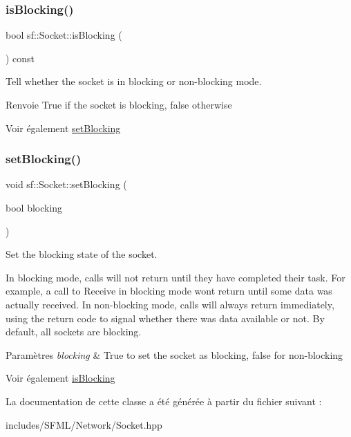 \subsubsection{\texorpdfstring{is\+Blocking()}{isBlocking()}}
{\footnotesize\ttfamily bool sf\+::\+Socket\+::is\+Blocking (\begin{DoxyParamCaption}{ }\end{DoxyParamCaption}) const}



Tell whether the socket is in blocking or non-\/blocking mode. 

\begin{DoxyReturn}{Renvoie}
True if the socket is blocking, false otherwise
\end{DoxyReturn}
\begin{DoxySeeAlso}{Voir également}
\hyperlink{classsf_1_1Socket_a165fc1423e281ea2714c70303d3a9782}{set\+Blocking} 
\end{DoxySeeAlso}
\mbox{\label{classsf_1_1Socket_a165fc1423e281ea2714c70303d3a9782}} 
\subsubsection{\texorpdfstring{set\+Blocking()}{setBlocking()}}
{\footnotesize\ttfamily void sf\+::\+Socket\+::set\+Blocking (\begin{DoxyParamCaption}\item[{bool}]{blocking }\end{DoxyParamCaption})}



Set the blocking state of the socket. 

In blocking mode, calls will not return until they have completed their task. For example, a call to Receive in blocking mode won\textquotesingle{}t return until some data was actually received. In non-\/blocking mode, calls will always return immediately, using the return code to signal whether there was data available or not. By default, all sockets are blocking.


\begin{DoxyParams}{Paramètres}
{\em blocking} & True to set the socket as blocking, false for non-\/blocking\\
\hline
\end{DoxyParams}
\begin{DoxySeeAlso}{Voir également}
\hyperlink{classsf_1_1Socket_ab1ceca9ac114b8baeeda3b34a0aca468}{is\+Blocking} 
\end{DoxySeeAlso}


La documentation de cette classe a été générée à partir du fichier suivant \+:\begin{DoxyCompactItemize}
\item 
includes/\+S\+F\+M\+L/\+Network/Socket.\+hpp\end{DoxyCompactItemize}
